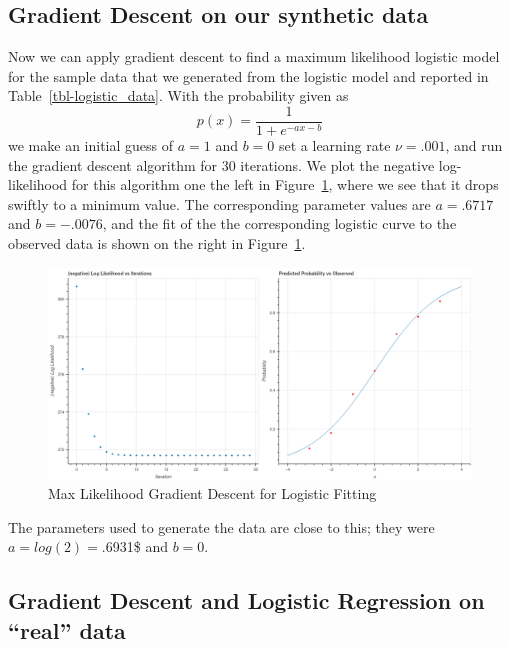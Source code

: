 \documentclass[
  11pt,
  letterpaper,
]{scrbook}
\theoremstyle{plain}
\theoremstyle{plain}
\theoremstyle{remark}
\begin{document}
\hypertarget{gradient-descent-on-our-synthetic-data}{%
\subsection{Gradient Descent on our synthetic
data}\label{gradient-descent-on-our-synthetic-data}}

Now we can apply gradient descent to find a maximum likelihood logistic
model for the sample data that we generated from the logistic model and
reported in Table~\ref{tbl-logistic_data}. With the probability given as
\[
p(x) = \frac{1}{1+e^{-ax-b}}
\] we make an initial guess of \(a=1\) and \(b=0\) set a learning rate
\(\nu=.001\), and run the gradient descent algorithm for \(30\)
iterations. We plot the negative log-likelihood for this algorithm one
the left in Figure~\ref{fig-logisticloglike}, where we see that it drops
swiftly to a minimum value. The corresponding parameter values are
\(a=.6717\) and \(b=-.0076\), and the fit of the the corresponding
logistic curve to the observed data is shown on the right in
Figure~\ref{fig-logisticloglike}.

\begin{figure}

{\centering \includegraphics[width=1\textwidth,height=\textheight]{chapters/img/LogisticLogLikelihoodAndFit.png}

}

\caption{\label{fig-logisticloglike}Max Likelihood Gradient Descent for
Logistic Fitting}

\end{figure}

The parameters used to generate the data are close to this; they were
\(a=log(2)=\).6931\$ and \(b=0\).

\hypertarget{gradient-descent-and-logistic-regression-on-real-data}{%
\subsection{Gradient Descent and Logistic Regression on ``real''
data}\label{gradient-descent-and-logistic-regression-on-real-data}}
\end{document}
